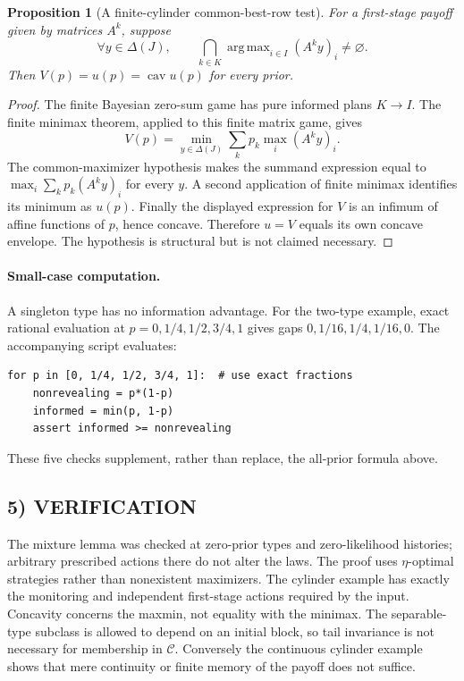\documentclass[11pt,a4paper]{article}
\DeclareMathOperator*{\argmax}{arg\,max}
\newtheorem{proposition}[theorem]{Proposition}
\theoremstyle{definition}
\theoremstyle{remark}
\begin{document}
\begin{proposition}[A finite-cylinder common-best-row test]
For a first-stage payoff given by matrices $A^k$, suppose
\[
 \forall y\in\Delta(J),\qquad
 \bigcap_{k\in K}\argmax_{i\in I}(A^ky)_i\ne\varnothing.
\]
Then $V(p)=u(p)=\operatorname{cav}u(p)$ for every prior.
\end{proposition}
\begin{proof}
The finite Bayesian zero-sum game has pure informed plans $K\to I$. The finite minimax theorem, applied to this finite matrix game, gives
\[
 V(p)=\min_{y\in\Delta(J)}\sum_kp_k\max_i(A^ky)_i.
\]
The common-maximizer hypothesis makes the summand expression equal to $\max_i\sum_kp_k(A^ky)_i$ for every $y$. A second application of finite minimax identifies its minimum as $u(p)$. Finally the displayed expression for $V$ is an infimum of affine functions of $p$, hence concave. Therefore $u=V$ equals its own concave envelope. The hypothesis is structural but is not claimed necessary.
\end{proof}

\paragraph{Small-case computation.}
A singleton type has no information advantage. For the two-type example, exact rational evaluation at $p=0,1/4,1/2,3/4,1$ gives gaps $0,1/16,1/4,1/16,0$. The accompanying script evaluates:
\begin{lstlisting}
for p in [0, 1/4, 1/2, 3/4, 1]:  # use exact fractions
    nonrevealing = p*(1-p)
    informed = min(p, 1-p)
    assert informed >= nonrevealing
\end{lstlisting}
These five checks supplement, rather than replace, the all-prior formula above.

\subsection*{5) VERIFICATION}
The mixture lemma was checked at zero-prior types and zero-likelihood histories; arbitrary prescribed actions there do not alter the laws. The proof uses $\eta$-optimal strategies rather than nonexistent maximizers. The cylinder example has exactly the monitoring and independent first-stage actions required by the input. Concavity concerns the maxmin, not equality with the minimax. The separable-type subclass is allowed to depend on an initial block, so tail invariance is not necessary for membership in $\mathcal C$. Conversely the continuous cylinder example shows that mere continuity or finite memory of the payoff does not suffice.
\end{document}
